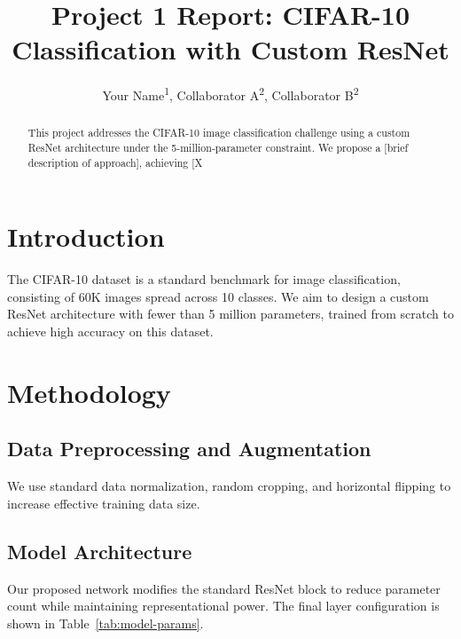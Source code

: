 \documentclass[letterpaper]{article}
\title{Project 1 Report: CIFAR-10 Classification with Custom ResNet}
\author{
    Your Name\textsuperscript{\rm 1},
    Collaborator A\textsuperscript{\rm 2},
    Collaborator B\textsuperscript{\rm 2}
}
\begin{document}
\maketitle

\begin{abstract}
This project addresses the CIFAR-10 image classification challenge using a custom ResNet architecture under the 5-million-parameter constraint. We propose a [brief description of approach], achieving [X%
\end{abstract}

\section{Introduction}
The CIFAR-10 dataset is a standard benchmark for image classification, consisting of 60K images spread across 10 classes. We aim to design a custom ResNet architecture with fewer than 5 million parameters, trained from scratch to achieve high accuracy on this dataset.

\section{Methodology}

\subsection{Data Preprocessing and Augmentation}
We use standard data normalization, random cropping, and horizontal flipping to increase effective training data size.

\subsection{Model Architecture}
Our proposed network modifies the standard ResNet block to reduce parameter count while maintaining representational power. The final layer configuration is shown in Table~\ref{tab:model-params}.
\end{document}
